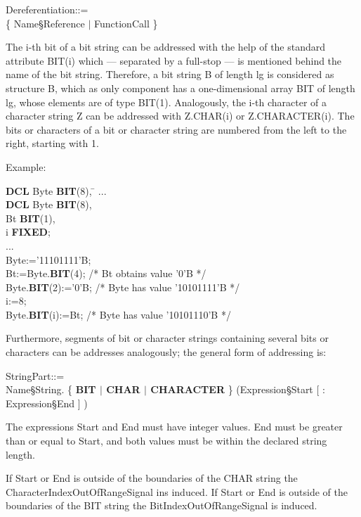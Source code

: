 Dereferentiation::=\\
 \{ Name\S Reference $\mid$ FunctionCall \}

The i-th bit of a bit string can be addressed with the help of the
standard attribute BIT(i) which --- separated by a full-stop --- is mentioned
behind the name of the bit string. Therefore, a bit string B of length
lg is considered as structure B, which as only component has a
one-dimensional array BIT of length lg, whose elements are of type
BIT(1). Analogously, the i-th character of a character string Z can be
addressed with Z.CHAR(i) or Z.CHARACTER(i). The bits or characters of a
bit or character string are numbered from the left to the right, starting with 1.

Example:

\begin{tabbing}
{\bf DCL} Byte {\bf BIT}(8), \= \kill
... \> \\
{\bf DCL} Byte {\bf BIT}(8), \> \\
\x Bt {\bf BIT}(1),   \> \\
\x i {\bf FIXED};     \> \\
... \> \\
Byte:='11101111'B;            \> \\
Bt:=Byte.{\bf BIT}(4);        \> /* Bt obtains value '0'B */\\
Byte.{\bf BIT}(2):='0'B;      \> /* Byte has value '10101111'B */\\
i:=8; \> \\
Byte.{\bf BIT}(i):=Bt;        \> /* Byte has value '10101110'B */
\end{tabbing}

Furthermore, segments of bit or character strings containing several
bits or characters can be addresses analogously; the general form of
addressing is:

StringPart::=\\
\x Name\S String. \{ {\bf BIT $\mid$ CHAR $\mid$ CHARACTER} \} (Expression\S Start [ : Expression\S End ] )

The expressions Start and End must have integer values. End must be
greater than or equal to Start, and both values must be within the
declared string length.
\begin{added}
If Start or End is outside of the boundaries of  the CHAR string
the CharacterIndexOutOfRangeSignal ins induced.
If Start or End is outside of the boundaries of  the BIT string
the BitIndexOutOfRangeSignal is induced.
\end{added}

